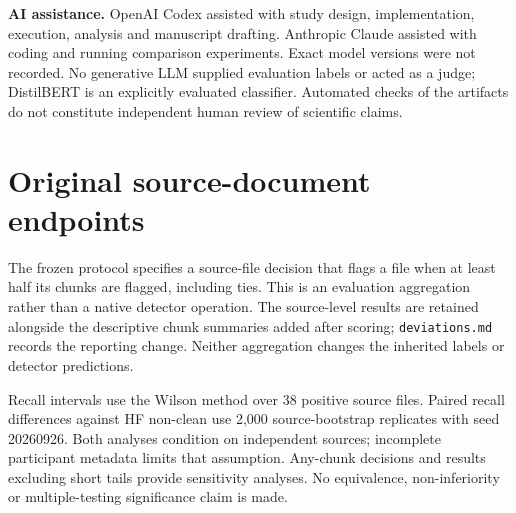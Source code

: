 \documentclass[10pt,a4paper,twocolumn]{article}
\begin{document}
\textbf{AI assistance.} OpenAI Codex assisted with study design,
implementation, execution, analysis and manuscript drafting. Anthropic
Claude assisted with coding and running comparison experiments. Exact
model versions were not recorded. No generative LLM supplied evaluation
labels or acted as a judge; DistilBERT is an explicitly evaluated
classifier. Automated checks of the artifacts do not constitute
independent human review of scientific claims.

\onecolumn

\appendix
\setcounter{table}{0}
\setcounter{figure}{0}
\renewcommand{\thetable}{\Alph{section}\arabic{table}}
\renewcommand{\thefigure}{\Alph{section}\arabic{figure}}

\section{Original source-document
endpoints}\label{original-source-document-endpoints}

The frozen protocol specifies a source-file decision that flags a file
when at least half its chunks are flagged, including ties. This is an
evaluation aggregation rather than a native detector operation. The
source-level results are retained alongside the descriptive chunk
summaries added after scoring; \texttt{deviations.md} records the
reporting change. Neither aggregation changes the inherited labels or
detector predictions.

Recall intervals use the Wilson method over 38 positive source files.
Paired recall differences against HF non-clean use 2,000
source-bootstrap replicates with seed 20260926. Both analyses condition
on independent sources; incomplete participant metadata limits that
assumption. Any-chunk decisions and results excluding short tails
provide sensitivity analyses. No equivalence, non-inferiority or
multiple-testing significance claim is made.
\end{document}
